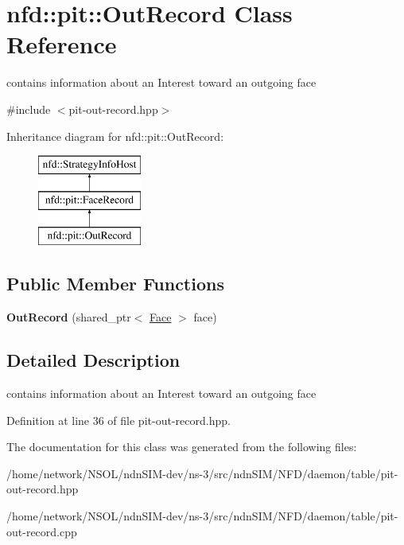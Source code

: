 \hypertarget{classnfd_1_1pit_1_1OutRecord}{}\section{nfd\+:\+:pit\+:\+:Out\+Record Class Reference}
\label{classnfd_1_1pit_1_1OutRecord}


contains information about an Interest toward an outgoing face  




{\ttfamily \#include $<$pit-\/out-\/record.\+hpp$>$}

Inheritance diagram for nfd\+:\+:pit\+:\+:Out\+Record\+:\begin{figure}[H]
\begin{center}
\leavevmode
\includegraphics[height=3.000000cm]{classnfd_1_1pit_1_1OutRecord}
\end{center}
\end{figure}
\subsection*{Public Member Functions}
\begin{DoxyCompactItemize}
\item 
{\bfseries Out\+Record} (shared\+\_\+ptr$<$ \hyperlink{classnfd_1_1Face}{Face} $>$ face)\hypertarget{classnfd_1_1pit_1_1OutRecord_adac228ae50a2d03cde23c2b4728e3aae}{}\label{classnfd_1_1pit_1_1OutRecord_adac228ae50a2d03cde23c2b4728e3aae}

\end{DoxyCompactItemize}


\subsection{Detailed Description}
contains information about an Interest toward an outgoing face 

Definition at line 36 of file pit-\/out-\/record.\+hpp.



The documentation for this class was generated from the following files\+:\begin{DoxyCompactItemize}
\item 
/home/network/\+N\+S\+O\+L/ndn\+S\+I\+M-\/dev/ns-\/3/src/ndn\+S\+I\+M/\+N\+F\+D/daemon/table/pit-\/out-\/record.\+hpp\item 
/home/network/\+N\+S\+O\+L/ndn\+S\+I\+M-\/dev/ns-\/3/src/ndn\+S\+I\+M/\+N\+F\+D/daemon/table/pit-\/out-\/record.\+cpp\end{DoxyCompactItemize}
